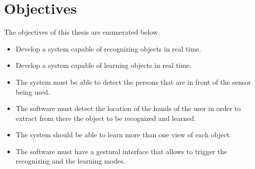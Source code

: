 \section{Objectives}

The objectives of this thesis are enumerated below. 

\begin{itemize}
	\item Develop a system capable of recognizing objects in real time.
	\item Develop a system capable of learning objects in real time. 
	\item The system must be able to detect the persons that are in front of the sensor being used. 
	\item The software must detect the location of the hands of the user in order to extract from there the object to be recognized and learned. 
	\item The system should be able to learn more than one view of each object. 
	\item The software must have a gestural interface that allows to trigger the recognizing and the learning modes. 

\end{itemize}
\\




